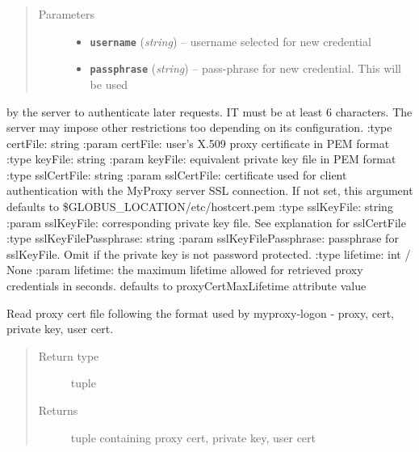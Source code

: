 \documentclass[letterpaper,10pt,english]{sphinxmanual}
\begin{document}
\begin{fulllineitems}
\begin{fulllineitems}
\begin{quote}
\begin{description}
\item[{Parameters}] \leavevmode\begin{itemize}
\item {} 
\textbf{\texttt{username}} (\emph{string}) -- username selected for new credential

\item {} 
\textbf{\texttt{passphrase}} (\emph{string}) -- pass-phrase for new credential.  This will be used

\end{itemize}

\end{description}\end{quote}

by the server to authenticate later requests.  IT must be at least
6 characters.  The server may impose other restrictions too depending
on its configuration.
:type certFile: string
:param certFile: user's X.509 proxy certificate in PEM format
:type keyFile: string
:param keyFile: equivalent private key file in PEM format
:type sslCertFile: string
:param sslCertFile: certificate used for client authentication with
the MyProxy server SSL connection.  If not set,
this argument defaults to \$GLOBUS\_LOCATION/etc/hostcert.pem 
:type sslKeyFile: string
:param sslKeyFile: corresponding private key file.  See explanation
for sslCertFile
:type sslKeyFilePassphrase: string 
:param sslKeyFilePassphrase: passphrase for sslKeyFile.  Omit if the
private key is not password protected.  
:type lifetime: int / None
:param lifetime: the maximum lifetime allowed for retrieved proxy 
credentials in seconds. defaults to proxyCertMaxLifetime attribute value

\end{fulllineitems}


\begin{fulllineitems}
\label{client:myproxy.client.MyProxyClient.readProxyFile}
Read proxy cert file following the format used by myproxy-logon - 
proxy, cert, private key, user cert.
\begin{quote}\begin{description}
\item[{Return type}] \leavevmode
tuple

\item[{Returns}] \leavevmode
tuple containing proxy cert, private key, user cert


\end{description}
\end{quote}
\end{fulllineitems}
\end{fulllineitems}
\end{document}
